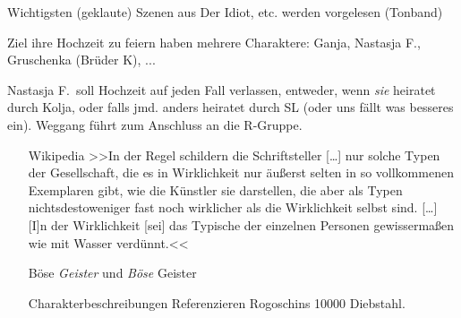 \documentclass[12pt, a4paper, openany]{report}
\begin{document}
\begin{itemize}
Wichtigsten (geklaute) Szenen aus Der Idiot, etc. werden vorgelesen (Tonband)

Ziel ihre Hochzeit zu feiern haben mehrere Charaktere: Ganja, Nastasja F.,
Gruschenka (Brüder K), ...

Nastasja F.~soll Hochzeit auf jeden Fall verlassen, entweder, wenn \emph{sie}
heiratet durch Kolja, oder falls jmd. anders heiratet durch SL (oder uns fällt
was besseres ein). Weggang führt zum Anschluss an die R-Gruppe.

\begin{itemize}
  \item[Wikipedia] >>In der Regel schildern die Schriftsteller […] nur solche Typen der
    Gesellschaft, die es in Wirklichkeit nur äußerst selten in so vollkommenen
    Exemplaren gibt, wie die Künstler sie darstellen, die aber als Typen
    nichtsdestoweniger fast noch wirklicher als die Wirklichkeit selbst sind.
    […] [I]n der Wirklichkeit [sei] das Typische der einzelnen Personen
    gewissermaßen wie mit Wasser verdünnt.<<
  \item[] Böse \emph{Geister} und \emph{Böse} Geister
  \item[] Charakterbeschreibungen Referenzieren Rogoschins 10000 Diebstahl. 
\end{itemize}

\end{itemize}
\end{document}
